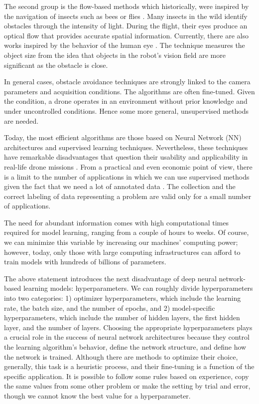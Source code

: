 The second group is the flow-based methods which historically, were inspired by the navigation of insects such as bees \citep{Srinivasan.Gregory:PTBS:1992} or flies \citep{Franceschini.Ruffier.ea:InTech:2009}. Many insects in the wild identify obstacles through the intensity of light. During the flight, their eyes produce an optical flow that provides accurate spatial information. Currently, there are also works inspired by the behavior of the human eye \citep{Al-Kaff.Meng.ea:IVS:2016}. The technique measures the object size from the idea that objects in the robot's vision field are more significant as the obstacle is close.

In general cases, obstacle avoidance techniques are strongly linked to the camera parameters and acquisition conditions. The algorithms are often fine-tuned. Given the condition, a drone operates in an environment without prior knowledge and under uncontrolled conditions. Hence some more general, unsupervised methods are needed.

Today, the most efficient algorithms are those based on Neural Network (NN) architectures and supervised learning techniques. Nevertheless, these techniques have remarkable disadvantages that question their usability and applicability in real-life drone missions \citep{Treboux.Genoud.ea:IWBIS:2018}. From a practical and even economic point of view, there is a limit to the number of applications in which we can use supervised methods given the fact that we need a lot of annotated data \citep{Xu.Wang.ea:CEA:2020}. The collection and the correct labeling of data representing a problem are valid only for a small number of applications.

The need for abundant information comes with high computational times required for model learning, ranging from a couple of hours to weeks. Of course, we can minimize this variable by increasing our machines' computing power; however, today, only those with large computing infrastructures can afford to train models with hundreds of billions of parameters.  

The above statement introduces the next disadvantage of deep neural network-based learning models: hyperparameters. We can roughly divide hyperparameters into two categories: 1) optimizer hyperparameters, which include the learning rate, the batch size, and the number of epochs, and 2) model-specific hyperparameters, which include the number of hidden layers, the first hidden layer, and the number of layers. Choosing the appropriate hyperparameters plays a crucial role in the success of neural network architectures because they control the learning algorithm's behavior, define the network structure, and define how the network is trained. Although there are methods to optimize their choice, generally, this task is a heuristic process, and their fine-tuning is a function of the specific application. It is possible to follow some rules based on experience, copy the same values from some other problem or make the setting by trial and error, though we cannot know the best value for a hyperparameter.

